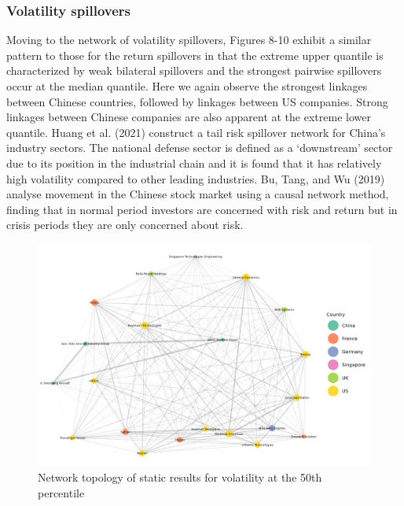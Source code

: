 \documentclass[
  letterpaper,
  DIV=11,
  numbers=noendperiod]{scrartcl}
\begin{document}
\hypertarget{volatility-spillovers}{%
\subsubsection{Volatility spillovers}\label{volatility-spillovers}}

Moving to the network of volatility spillovers, Figures 8-10 exhibit a
similar pattern to those for the return spillovers in that the extreme
upper quantile is characterized by weak bilateral spillovers and the
strongest pairwise spillovers occur at the median quantile. Here we
again observe the strongest linkages between Chinese countries, followed
by linkages between US companies. Strong linkages between Chinese
companies are also apparent at the extreme lower quantile. Huang et al.
(2021) construct a tail risk spillover network for China's industry
sectors. The national defense sector is defined as a `downstream' sector
due to its position in the industrial chain and it is found that it has
relatively high volatility compared to other leading industries. Bu,
Tang, and Wu (2019) analyse movement in the Chinese stock market using a
causal network method, finding that in normal period investors are
concerned with risk and return but in crisis periods they are only
concerned about risk.

\begin{figure}[H]

{\centering \includegraphics[width=6.75in,height=\textheight]{plots/fig-vol50.png}

}

\caption{\label{fig-vol50}Network topology of static results for
volatility at the 50th percentile}

\end{figure}
\end{document}
